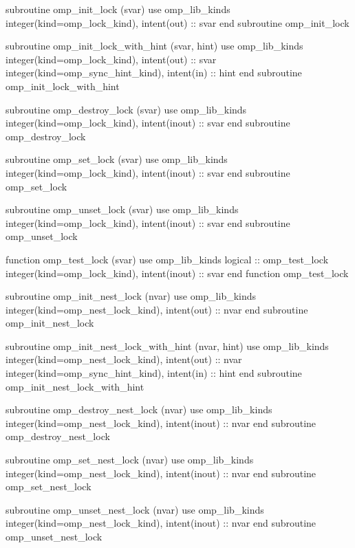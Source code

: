 {\begin{ompfFunction}
          subroutine omp_init_lock (svar)
           use omp_lib_kinds
           integer(kind=omp_lock_kind), intent(out) :: svar
          end subroutine omp_init_lock

          subroutine omp_init_lock_with_hint (svar, hint)
           use omp_lib_kinds
           integer(kind=omp_lock_kind), intent(out) :: svar
           integer(kind=omp_sync_hint_kind), intent(in) :: hint
          end subroutine omp_init_lock_with_hint

          subroutine omp_destroy_lock (svar)
           use omp_lib_kinds
           integer(kind=omp_lock_kind), intent(inout) :: svar
          end subroutine omp_destroy_lock

          subroutine omp_set_lock (svar)
           use omp_lib_kinds
           integer(kind=omp_lock_kind), intent(inout) :: svar
          end subroutine omp_set_lock

          subroutine omp_unset_lock (svar)
           use omp_lib_kinds
           integer(kind=omp_lock_kind), intent(inout) :: svar
          end subroutine omp_unset_lock

          function omp_test_lock (svar)
           use omp_lib_kinds
           logical :: omp_test_lock
           integer(kind=omp_lock_kind), intent(inout) :: svar
          end function omp_test_lock

          subroutine omp_init_nest_lock (nvar)
           use omp_lib_kinds
           integer(kind=omp_nest_lock_kind), intent(out) :: nvar
          end subroutine omp_init_nest_lock

          subroutine omp_init_nest_lock_with_hint (nvar, hint)
           use omp_lib_kinds
           integer(kind=omp_nest_lock_kind), intent(out) :: nvar
           integer(kind=omp_sync_hint_kind), intent(in) :: hint
          end subroutine omp_init_nest_lock_with_hint

          subroutine omp_destroy_nest_lock (nvar)
           use omp_lib_kinds
           integer(kind=omp_nest_lock_kind), intent(inout) :: nvar
          end subroutine omp_destroy_nest_lock

          subroutine omp_set_nest_lock (nvar)
           use omp_lib_kinds
           integer(kind=omp_nest_lock_kind), intent(inout) :: nvar
          end subroutine omp_set_nest_lock

          subroutine omp_unset_nest_lock (nvar)
           use omp_lib_kinds
           integer(kind=omp_nest_lock_kind), intent(inout) :: nvar
          end subroutine omp_unset_nest_lock


\end{ompfFunction}}
